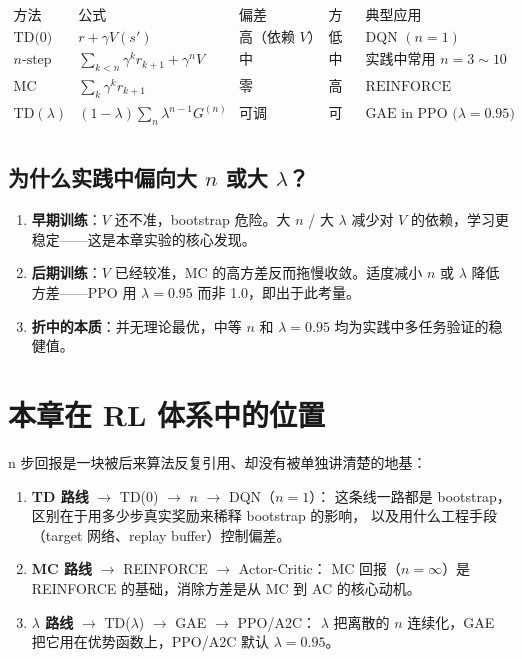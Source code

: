 \documentclass{article}
\begin{document}
\[
\begin{array}{c|c|c|c|c}
\text{方法} & \text{公式} & \text{偏差} & \text{方差} & \text{典型应用} \\
\hline
\text{TD(0)}    & r+\gamma V(s')                       & \text{高（依赖 }V\text{）} & \text{低}  & \text{DQN } (n{=}1) \\
n\text{-step}   & \sum_{k<n}\gamma^k r_{k+1}+\gamma^n V & \text{中}                  & \text{中}  & \text{实践中常用 } n{=}3{\sim}10 \\
\text{MC}       & \sum_k \gamma^k r_{k+1}              & \text{零}                  & \text{高}  & \text{REINFORCE} \\
\text{TD}(\lambda) & (1-\lambda)\sum_n \lambda^{n-1} G^{(n)} & \text{可调}           & \text{可调} & \text{GAE in PPO ($\lambda{=}0.95$)} \\
\end{array}
\]

\subsection*{为什么实践中偏向大 $n$ 或大 $\lambda$？}

\begin{enumerate}
  \item \textbf{早期训练}：$V$ 还不准，bootstrap 危险。大 $n$ / 大 $\lambda$ 减少对 $V$ 的依赖，学习更稳定——这是本章实验的核心发现。
  \item \textbf{后期训练}：$V$ 已经较准，MC 的高方差反而拖慢收敛。适度减小 $n$ 或 $\lambda$ 降低方差——PPO 用 $\lambda=0.95$ 而非 1.0，即出于此考量。
  \item \textbf{折中的本质}：并无理论最优，中等 $n$ 和 $\lambda=0.95$ 均为实践中多任务验证的稳健值。
\end{enumerate}

\section*{本章在 RL 体系中的位置}

n 步回报是一块被后来算法反复引用、却没有被单独讲清楚的地基：

\begin{enumerate}
  \item \textbf{TD 路线} $\to$ TD(0) $\to$ $n$ $\to$ DQN（$n=1$）：
        这条线一路都是 bootstrap，区别在于用多少步真实奖励来稀释 bootstrap 的影响，
        以及用什么工程手段（target 网络、replay buffer）控制偏差。
  \item \textbf{MC 路线} $\to$ REINFORCE $\to$ Actor-Critic：
        MC 回报（$n=\infty$）是 REINFORCE 的基础，消除方差是从 MC 到 AC 的核心动机。
  \item \textbf{$\lambda$ 路线} $\to$ TD($\lambda$) $\to$ GAE $\to$ PPO/A2C：
        $\lambda$ 把离散的 $n$ 连续化，GAE 把它用在优势函数上，PPO/A2C 默认 $\lambda=0.95$。
\end{enumerate}
\end{document}
